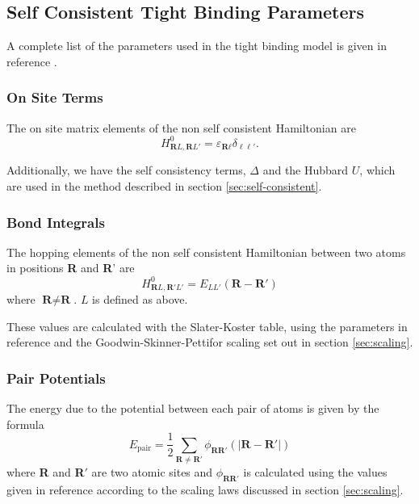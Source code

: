 \documentclass[reprint,]{revtex4-2}
\begin{document}
\subsection{Self Consistent Tight Binding Parameters}
A complete list of the parameters used in the tight binding model is given in reference \cite{Lozovoi2014}.

\subsubsection{On Site Terms}
The on site matrix elements of the non self consistent Hamiltonian \cite{Paxton2009} are
\begin{equation}
	H^{0}_{\textbf{R}L,\textbf{R}L'}=\varepsilon_{\textbf{R}\ell}\delta_{\ell\ell'}.
\end{equation}

Additionally, we have the self consistency terms, $\Delta$ and the Hubbard $U$, which are used in the method described in section \ref{sec:self-consistent}.
\subsubsection{Bond Integrals}
The hopping elements of the non self consistent Hamiltonian between two atoms in positions \textbf{R} and \textbf{R}' are 
\begin{equation}
	H^{0}_{\textbf{R}L,\textbf{R}'L'}=E_{LL'}(\textbf{R}-\textbf{R}')
\end{equation}
where $\textbf{R}\neq\textbf{R}$\cite{Lozovoi2014}. $L$ is defined as above.

These values are calculated with the Slater-Koster table,\cite{Slater1954} using the parameters in reference \cite{Lozovoi2014} and the Goodwin-Skinner-Pettifor scaling set out in section \ref{sec:scaling}.

\subsubsection{Pair Potentials}
\label{sec:pairpotential}
The energy due to the potential between each pair of atoms is given by the formula
\begin{equation}
	E_{\text{pair}}=\frac{1}{2}\sum_{\textbf{R} \neq \textbf{R}'}\phi_{\textbf{RR}'}(|\textbf{R}-\textbf{R}'|)
\end{equation}
where \textbf{R} and \textbf{R}$'$ are two atomic sites and $\phi_{\textbf{R}\textbf{R}'}$ is calculated using the values given in reference \cite{Lozovoi2014} according to the scaling laws discussed in section \ref{sec:scaling}.\cite{Sheppard2014}
\end{document}
